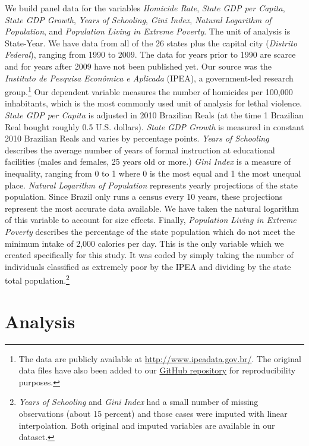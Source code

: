 \documentclass[a4paper,11pt]{article}
\begin{document}
We build panel data for the variables \textit{Homicide Rate}, \textit{State GDP per Capita}, \textit{State GDP Growth}, \textit{Years of Schooling}, \textit{Gini Index}, \textit{Natural Logarithm of Population}, and \textit{Population Living in Extreme Poverty}. The unit of analysis is State-Year. We have data from all of the 26 states plus the capital city (\textit{Distrito Federal}), ranging from 1990 to 2009. The data for years prior to 1990 are scarce and for years after 2009 have not been published yet. Our source was the \textit{Instituto de Pesquisa Econ\^{o}mica e Aplicada} (IPEA), a government-led research group.\footnote{The data are publicly available at \href{http://www.ipeadata.gov.br/}{http://www.ipeadata.gov.br/}. The original data files have also been added to our \href{https://github.com/danilofreire/replication-files/tree/master/2015/intelligent-policing}{GitHub repository} for reproducibility purposes.} Our dependent variable measures the number of homicides per 100,000 inhabitants, which is the most commonly used unit of analysis for lethal violence. \textit{State GDP per Capita} is adjusted in 2010 Brazilian Reals (at the time 1 Brazilian Real bought roughly 0.5 U.S. dollars). \textit{State GDP Growth} is measured in constant 2010 Brazilian Reals and varies by percentage points. \textit{Years of Schooling} describes the average number of years of formal instruction at educational facilities (males and females, 25 years old or more.) \textit{Gini Index} is a measure of inequality, ranging from 0 to 1 where 0 is the most equal and 1 the most unequal place. \textit{Natural Logarithm of Population} represents yearly projections of the state population. Since Brazil only runs a census every 10 years, these projections represent the most accurate data available. We have taken the natural logarithm of this variable to account for size effects. Finally, \textit{Population Living in Extreme Poverty} describes the percentage of the state population which do not meet the minimum intake of 2,000 calories per day. This is the only variable which we created specifically for this study. It was coded by simply taking the number of individuals classified as extremely poor by the IPEA and dividing by the state total population.\footnote{\textit{Years of Schooling} and \textit{Gini Index} had a small number of missing observations (about 15 percent) and those cases were imputed with linear interpolation. Both original and imputed variables are available in our dataset.}

\section{Analysis}
\end{document}
